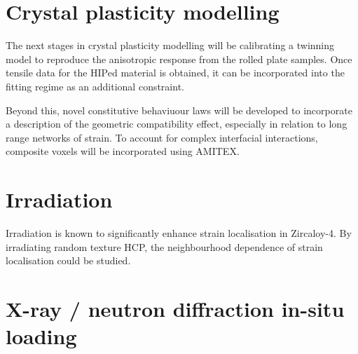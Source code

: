 \section{Crystal plasticity modelling}
The next stages in crystal plasticity modelling will be calibrating a twinning model to reproduce the anisotropic response from the rolled plate samples.
Once tensile data for the HIPed material is obtained, it can be incorporated into the fitting regime as an additional constraint.

Beyond this, novel constitutive behaviuour laws will be developed to incorporate a description of the geometric compatibility effect, especially in relation to long range networks of strain.
To account for complex interfacial interactions, composite voxels will be incorporated using AMITEX.

\section{Irradiation}
Irradiation is known to significantly enhance strain localisation in Zircaloy-4.
By irradiating random texture HCP, the neighbourhood dependence of strain localisation could be studied.

\section{X-ray / neutron diffraction in-situ loading}
